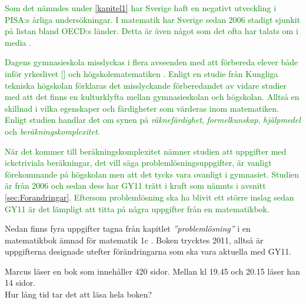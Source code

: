 
\textcolor{green}{Som det nämndes under \ref{kapitel1} har Sverige haft en negativt utveckling i PISA:s årliga undersökningar. I matematik har Sverige sedan 2006 stadigt sjunkit på listan bland OECD:s länder. Detta är även något som det ofta har talats om i media \cite{pisaImedia}.}

\textcolor{green}{Dagens gymnasieskola misslyckas i flera avseenden med att förbereda elever både inför yrkeslivet [] och högskolematematiken \cite{spriddKunskap}. Enligt en studie från Kungliga tekniska högskolan förklaras det misslyckande förberedandet av vidare studier med att det finns en kulturklyfta mellan gymnasieskolan och högskolan. Alltså en skillnad i vilka egenskaper och färdigheter som värderas inom matematiken. Enligt studien handlar det om synen på \textit{räknefärdighet}, \textit{formelkunskap}, \textit{hjälpmedel} och \textit{beräkningskomplexitet}.}

\textcolor{green}{När det kommer till beräkningskomplexitet nämner studien att uppgifter med icketriviala beräkningar, det vill säga problemlösningsuppgifter, är vanligt förekommande på högskolan men att det tycks vara ovanligt i gymnasiet. Studien är från 2006 och sedan dess har GY11 trätt i kraft som nämnts i avsnitt \ref{sec:Forandringar}. Eftersom problemlösning ska ha blivit ett större inslag sedan GY11 är det lämpligt att titta på några uppgifter från en matematikbok. }

\textcolor{WildStrawberry}{
    Nedan finns fyra uppgifter tagna från kapitlet \textit{''problemlösning''} i en matematikbok ämnad för matematik 1c \cite{matte5000}. Boken trycktes 2011, alltså är uppgifterna designade utefter förändringarna som ska vara aktuella med GY11.}



\begin{displayquote}
\textcolor{turkos}{Marcus läser en bok som innehåller 420 sidor. Mellan kl 19.45 och 20.15 läser han 14 sidor. \\
Hur lång tid tar det att läsa hela boken?}
\end{displayquote}

